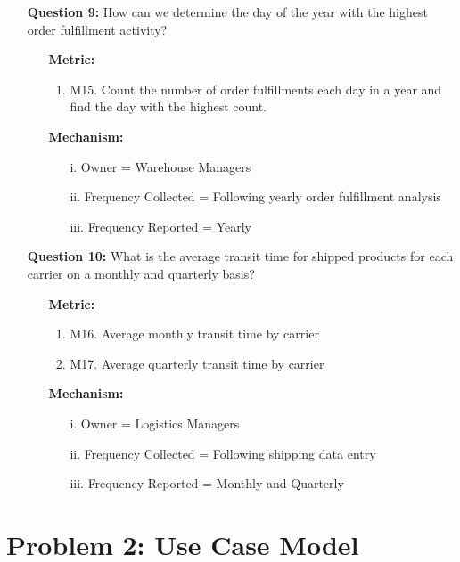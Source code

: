 \documentclass[english,12pt,a4paper]{report}
\begin{document}
\begin{itemize}
		\item[\textbullet] \textbf{Question 9:} How can we determine the day of the year with the highest order fulfillment activity? 
		\begin{itemize}
			\item[] \textbf{Metric:}
			\begin{enumerate}[label={}, left=0em]
				\item M15. Count the number of order fulfillments each day in a year and find the day with the highest count.
			\end{enumerate}
			\item[] \textbf{Mechanism:}
			\begin{enumerate}[label={}, left=0em]
				\item[i.] Owner = Warehouse Managers
				\item[ii.] Frequency Collected = Following yearly order fulfillment analysis
				\item[iii.] Frequency Reported = Yearly
			\end{enumerate}
		\end{itemize}
		
		\item[\textbullet] \textbf{Question 10:} What is the average transit time for shipped products for each carrier on a monthly and quarterly basis? 
		\begin{itemize}
			\item[] \textbf{Metric:}
			\begin{enumerate}[label={}, left=0em]
				\item M16. Average monthly transit time by carrier
				\item M17. Average quarterly transit time by carrier
			\end{enumerate}
			\item[] \textbf{Mechanism:}
			\begin{enumerate}[label={}, left=0em]
				\item[i.] Owner = Logistics Managers
				\item[ii.] Frequency Collected = Following shipping data entry
				\item[iii.] Frequency Reported = Monthly and Quarterly
			\end{enumerate}
		\end{itemize}
	\end{itemize}
	
	
	\chapter{Problem 2: Use Case Model}
\end{document}
